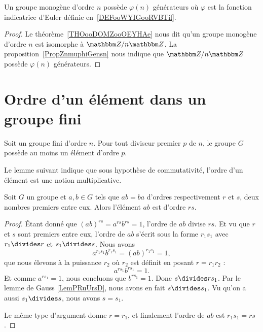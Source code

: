 \begin{corollary}\label{CORooMBLSooMHKmAq}
    Un groupe monogène d'ordre \( n\) possède \( \varphi(n)\) générateurs où \( \varphi\) est la fonction indicatrice d'Euler définie en~\ref{DEFooWYIGooRVBTil}.
\end{corollary}

\begin{proof}
    Le théorème~\ref{THOooDOMZooOEYHAe} nous dit qu'un groupe monogène d'ordre \( n\) est isomorphe à \( \eZ/n\eZ\). La proposition~\ref{PropZnmuphiGensn} nous indique que \( \eZ/n\eZ\) possède \( \varphi(n)\) générateurs.
\end{proof}

\section{Ordre d'un élément dans un groupe fini}
\begin{theorem}    \label{THOooSUWKooICbzqM}
    Soit un groupe fini d'ordre \( n\). Pour tout diviseur premier \( p\) de \( n\), le groupe \( G\) possède au moins un élément d'ordre \( p\).
\end{theorem}

Le lemme suivant indique que sous hypothèse de commutativité, l'ordre d'un élément est une notion multiplicative.
\begin{lemma}    \label{LemyETtdy}
    Soit \( G\) un groupe et \( a,b\in G\) tels que \( ab=ba\) d'ordres respectivement \( r\) et \( s\), deux nombres premiers entre eux. Alors l'élément \( ab\) est d'ordre \( rs\).
\end{lemma}

\begin{proof}
    Étant donné que \( (ab)^{rs}=a^{rs}b^{rs}=1\), l'ordre de \( ab\) divise \( rs\). Et vu que \( r\) et \( s\) sont premiers entre eux, l'ordre de \( ab\) s'écrit sous la forme \( r_1s_1\) avec \( r_1\divides r\) et \( s_1\divides s\). Nous avons
    \begin{equation}
        a^{r_1s_1}b^{r_1s_1}=(ab)^{r_1s_1}=1,
    \end{equation}
    que nous élevons à la puissance \( r_2\) où \( r_2\) est définit en posant \(r=r_1r_2\) :
    \begin{equation}
        a^{rs_1}b^{rs_1}=1.
    \end{equation}
    Et comme \( a^{rs_1}=1\), nous concluons que \( b^{rs_1}=1\). Donc \( s\divides rs_1\). Par le lemme de Gauss \ref{LemPRuUrsD}, nous avons en fait \( s\divides s_1\). Vu qu'on a aussi \( s_1\divides s\), nous avons \( s=s_1\).

    Le même type d'argument donne \( r=r_1\), et finalement l'ordre de \( ab\) est \( r_1s_1=rs\).
\end{proof}

